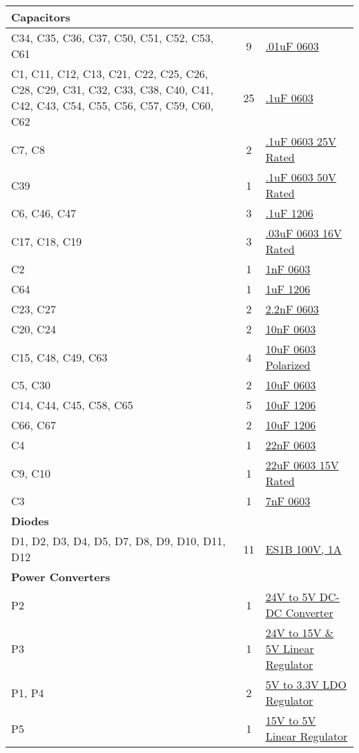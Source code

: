 \begin{longtable}{| >{\centering\arraybackslash}p{} | c | l |}
 {\textbf{Capacitors}}  \\ \hline
C34, C35, C36, C37, C50, C51, C52, C53, C61 & 9 & \href{}{.01uF 0603} \\ \hline
C1, C11, C12, C13, C21, C22, C25, C26, C28, C29, C31, C32, C33, C38, C40, C41, C42, C43, C54, C55, C56, C57, C59, C60, C62 & 25 & \href{}{.1uF 0603} \\ \hline
C7, C8 & 2 & \href{}{.1uF 0603 25V Rated} \\ \hline
C39 & 1 & \href{}{.1uF 0603 50V Rated} \\ \hline
C6, C46, C47 & 3 & \href{}{.1uF 1206} \\ \hline
C17, C18, C19 & 3 & \href{}{.03uF 0603 16V Rated} \\ \hline
C2 & 1 & \href{}{1nF 0603} \\ \hline
C64 & 1 & \href{}{1uF 1206} \\ \hline
C23, C27 & 2 & \href{}{2.2nF 0603} \\ \hline
C20, C24 & 2 & \href{}{10nF 0603} \\ \hline
C15, C48, C49, C63 & 4 & \href{}{10uF 0603 Polarized} \\ \hline
C5, C30 & 2 & \href{}{10uF 0603} \\ \hline
C14, C44, C45, C58, C65 & 5 & \href{}{10uF 1206} \\ \hline
C66, C67 & 2 & \href{}{10uF 1206} \\ \hline
C4 & 1 & \href{}{22nF 0603} \\ \hline
C9, C10 & 1 & \href{}{22uF 0603 15V Rated} \\ \hline
C3& 1 & \href{}{7nF 0603} \\ \hline

 {\textbf{Diodes}}  \\ \hline
D1, D2, D3, D4, D5, D7, D8, D9, D10, D11, D12 & 11 & \href{http://www.digikey.com/product-detail/en/ES1B/ES1BFSCT-ND/3042546}{ES1B 100V, 1A}\\ \hline

 {\textbf{Power Converters}}  \\ \hline
P2 & 1 & \href{http://www.digikey.com/product-search/en?WT.z_header=search_go&lang=en&site=us&keywords=CC10-2405SF-E&x=0&y=0&formaction=on}{24V to 5V DC-DC Converter}\\ \hline
P3 & 1 & \href{http://www.digikey.com/product-search/en?vendor=0&keywords=IFX21004TNV51}{24V to 15V \& 5V Linear Regulator}\\ \hline
P1, P4 & 2 & \href{http://www.digikey.com/product-detail/en/TLV1117LV33DCYR/296-28778-1-ND/2666520}{5V to 3.3V LDO Regulator}\\ \hline
P5 & 1 & \href{http://www.digikey.com/product-detail/en/LM2937IMPX-5.0\%2FNOPB/LM2937IMPX-5.0\%2FNOPBCT-ND/3526931}{15V to 5V Linear Regulator}\\ \hline


\end{longtable}
